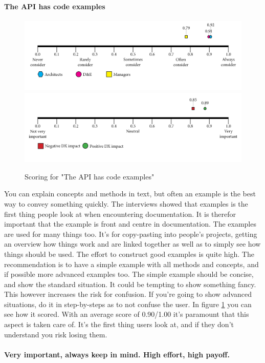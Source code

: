     \paragraph{The API has code examples}
    \begin{figure}[H]
        \centering
        \includegraphics[width=\linewidth]{scorelines/aspect4.png}
        \includegraphics[width=\linewidth]{dxscorelines/dxaspect4.png}
        \caption{Scoring for "The API has code examples"}
        \label{fig:aspect4}
    \end{figure}
    You can explain concepts and methods in text, but often an example is the best way to convey something quickly. The interviews showed that examples is the first thing people look at when encountering documentation. It is therefor important that the example is front and centre in documentation. The examples are used for many things too. It's for copy-pasting into people's projects, getting an overview how things work and are linked together as well as to simply see how things should be used. The effort to construct good examples is quite high. The recommendation is to  have a simple example with all methods and concepts, and if possible more advanced examples too. The simple example should be concise, and show the standard situation. It could be tempting to show something fancy. This however increases the risk for confusion. If you're going to show advanced situations, do it in step-by-steps as to not confuse the user. In figure \ref{fig:aspect4} you can see how it scored. With an average score of 0.90/1.00 it's paramount that this aspect is taken care of. It's the first thing users look at, and if they don't understand you risk losing them. \\ \\
    \textbf{Very important, always keep in mind. High effort, high payoff.}
